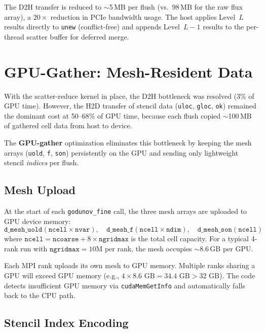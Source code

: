\documentclass[11pt,fleqn]{book}
\begin{document}
The D2H transfer is reduced to $\sim$5\,MB per flush (vs.\ 98\,MB for the raw flux array), a $20\times$ reduction in PCIe bandwidth usage.  The host applies Level~$L$ results directly to \texttt{unew} (conflict-free) and appends Level~$L{-}1$ results to the per-thread scatter buffer for deferred merge.

\section{GPU-Gather: Mesh-Resident Data}
\label{sec:gpu-gather}

With the scatter-reduce kernel in place, the D2H bottleneck was resolved (3\% of GPU time).  However, the H2D transfer of stencil data (\texttt{uloc}, \texttt{gloc}, \texttt{ok}) remained the dominant cost at 50--68\% of GPU time, because each flush copied $\sim$100\,MB of gathered cell data from host to device.

The \textbf{GPU-gather} optimization eliminates this bottleneck by keeping the mesh arrays (\texttt{uold}, \texttt{f}, \texttt{son}) persistently on the GPU and sending only lightweight stencil \emph{indices} per flush.

\subsection{Mesh Upload}

At the start of each \texttt{godunov\_fine} call, the three mesh arrays are uploaded to GPU device memory:
\[
\texttt{d\_mesh\_uold}(\texttt{ncell} \times \texttt{nvar}), \quad
\texttt{d\_mesh\_f}(\texttt{ncell} \times \texttt{ndim}), \quad
\texttt{d\_mesh\_son}(\texttt{ncell})
\]
where $\texttt{ncell} = \texttt{ncoarse} + 8 \times \texttt{ngridmax}$ is the total cell capacity.  For a typical 4-rank run with $\texttt{ngridmax} = 10\text{M}$ per rank, the mesh occupies $\sim$8.6\,GB per GPU.

\begin{infobox}
Each MPI rank uploads its own mesh to GPU memory.  Multiple ranks sharing a GPU will exceed GPU memory (e.g., $4 \times 8.6\text{ GB} = 34.4\text{ GB} > 32\text{ GB}$).  The code detects insufficient GPU memory via \texttt{cudaMemGetInfo} and automatically falls back to the CPU path.
\end{infobox}

\subsection{Stencil Index Encoding}
\end{document}
